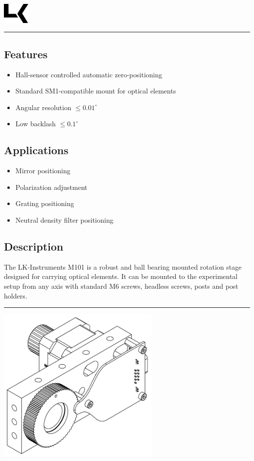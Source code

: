 \documentclass[a4paper, final, 12pt, oneside]{scrartcl}
\numberwithin{equation}{section}
\numberwithin{table}{section}
\numberwithin{figure}{section}
\begin{document}
\thispagestyle{empty}
\includegraphics[width=0.1\textwidth]{../general/logo_black.pdf}
\hfill {\Huge \textbf{\textsf{\productName}}} \hfill {\Huge \textbf{\textsf{\productNumber}}}\\
\noindent\rule{\textwidth}{0.4pt}

\begin{multicols}{2}
\subsection*{Features}
\begin{itemize}
  \item[] Hall-sensor controlled automatic zero-positioning
  \item[] Standard SM1-compatible mount for optical elements
  \item[] Angular resolution $\leq 0.01^{\circ}$
  \item[] Low backlash $\leq 0.1^{\circ}$
\end{itemize}
\FloatBarrier

\subsection*{Applications}
\begin{itemize}
  \item[] Mirror positioning
  \item[] Polarization adjustment
  \item[] Grating positioning
  \item[] Neutral density filter positioning
\end{itemize}
\FloatBarrier

\subsection*{Description}
The LK-Instruments M101 is a robust and ball bearing mounted rotation
stage designed for carrying optical elements. It can be mounted to the
experimental setup from any axis with standard M6 screws, headless screws,
posts and post holders. 
\end{multicols}
\noindent\rule{\textwidth}{0.4pt}
\vspace*{0.5cm}

\centerline{\includegraphics[width=0.6\textwidth]{./drawings/m101_full_dwg.pdf}}
\end{document}
